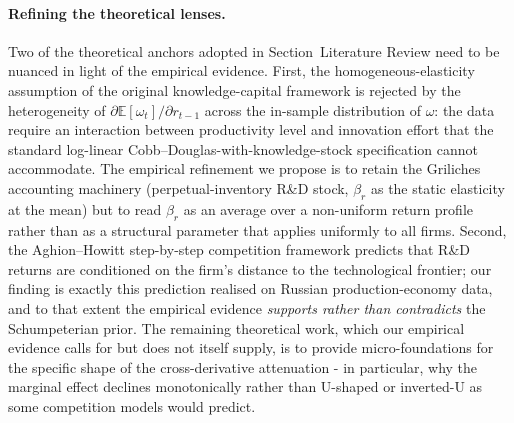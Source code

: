 \documentclass[a4paper, 12pt]{article}
\begin{document}
\paragraph{Refining the theoretical lenses.} Two of the theoretical anchors adopted in Section~Literature Review need to be nuanced in light of the empirical evidence. First, the homogeneous-elasticity assumption of the original \textcite{griliches1979issues} knowledge-capital framework is rejected by the heterogeneity of $\partial \mathbb{E}[\omega_t]/\partial r_{t-1}$ across the in-sample distribution of $\omega$: the data require an interaction between productivity level and innovation effort that the standard log-linear Cobb--Douglas-with-knowledge-stock specification cannot accommodate. The empirical refinement we propose is to retain the Griliches accounting machinery (perpetual-inventory R\&D stock, $\beta_r$ as the static elasticity at the mean) but to read $\beta_r$ as an average over a non-uniform return profile rather than as a structural parameter that applies uniformly to all firms. Second, the Aghion--Howitt step-by-step competition framework \parencite{aghion1990model} predicts that R\&D returns are conditioned on the firm's distance to the technological frontier; our finding is exactly this prediction realised on Russian production-economy data, and to that extent the empirical evidence \emph{supports rather than contradicts} the Schumpeterian prior. The remaining theoretical work, which our empirical evidence calls for but does not itself supply, is to provide micro-foundations for the specific shape of the cross-derivative attenuation - in particular, why the marginal effect declines monotonically rather than U-shaped or inverted-U as some competition models would predict.
\end{document}
